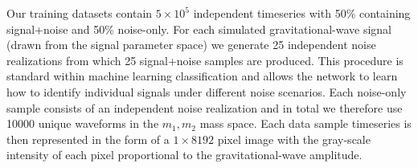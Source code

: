 \documentclass[%
showpacs,
 amsmath,amssymb,
 aps,
 twocolumn,
 prl,
 reprint,
floatfix,
]{revtex4-1}
\begin{document}
%
%
Our training datasets contain $5\times 10^{5}$ independent timeseries with 50\%
containing signal+noise and 50\% noise-only. For each simulated
gravitational-wave signal (drawn from the signal parameter space) we generate
25 independent noise realizations from which 25 signal+noise samples are
produced. This procedure is standard within machine learning classification and
allows the network to learn how to identify individual signals under different
noise scenarios. Each noise-only sample consists of an independent noise
realization and in total we therefore use 10000 unique waveforms in the
$m_{1},m_{2}$ mass space. Each data sample timeseries is then represented in
the form of a $1 \times 8192$ pixel image with the gray-scale intensity of each
pixel proportional to the gravitational-wave amplitude.

%
%
\end{document}
